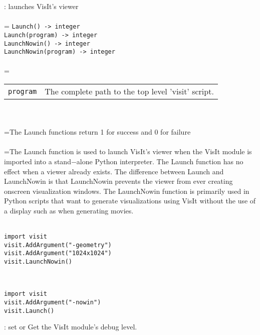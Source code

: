 \documentclass[10pt,a4paper]{report}
\begin{document}
{}
: launches VisIt's viewer\\[-3mm]

 \\ 
\hangindent=\parindent 
\verb!Launch() -> integer!\\ 
\verb!Launch(program) -> integer!\\ 
\verb!LaunchNowin() -> integer!\\ 
\verb!LaunchNowin(program) -> integer!\\ [-3mm]

 \\ 
\hangindent=\parindent 
\begin{tabular}{lp{9cm}}
\verb!program! & The complete path to the top level 'visit' script. \\
\end{tabular} \\[-2mm]


 \\ 
\hangindent=\parindent The Launch functions return 1 for success and 0 for failure \\[-3mm] 

 \\ 
\hangindent=\parindent The Launch function is used to launch VisIt's viewer when the VisIt module is imported into a stand$-$alone Python interpreter. The Launch function has no effect when a viewer already exists. The difference between Launch and LaunchNowin is that LaunchNowin prevents the viewer from ever creating onscreen visualization windows. The LaunchNowin function is primarily used in Python scripts that want to generate visualizations using VisIt without the use of a display such as when generating movies. \\[-3mm] 

\\[-6mm]
\begin{verbatim}import visit
visit.AddArgument("-geometry")
visit.AddArgument("1024x1024")
visit.LaunchNowin()
\end{verbatim}
\\[-6mm]
\begin{verbatim}import visit
visit.AddArgument("-nowin")
visit.Launch()
\end{verbatim}
\newpage


{}
: set or Get the VisIt module's debug level.\\[-3mm]
\end{document}
